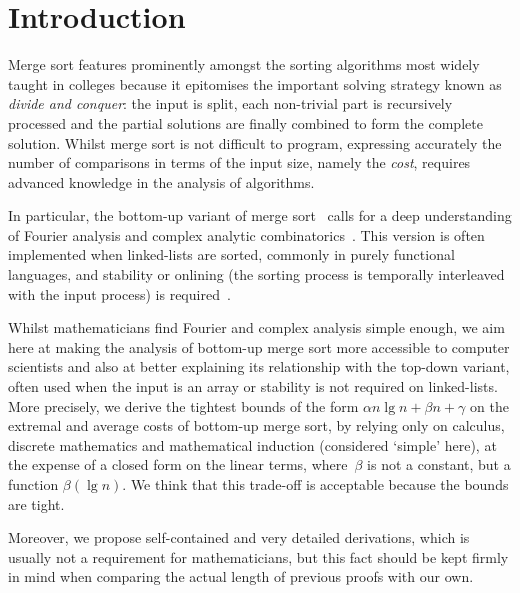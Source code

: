 \section{Introduction}

Merge sort features prominently amongst the sorting algorithms most
widely taught in colleges because it epitomises the important solving
strategy known as \emph{divide and conquer}: the input is split, each
non-trivial part is recursively processed and the partial
solutions are finally combined to form the complete solution. Whilst
merge sort is not difficult to program, expressing accurately the
number of comparisons in terms of the input size, namely the
\emph{cost}, requires advanced knowledge in the analysis of
algorithms.

In particular, the bottom-up variant of merge
sort~\cite{PannyProdinger:1995,Knuth:1998} calls for a deep
understanding of Fourier analysis and complex analytic
combinatorics~\cite{Delange:1975, FlajoletGolin:1994, Hwang:1998,
  ChenHwangChen:1999, FlajoletSedgewick:2009}. This version is often
implemented when linked-lists are sorted, commonly in purely
functional languages, and stability or onlining (the sorting process
is temporally interleaved with the input process) is
required~\cite{Okasaki:1998}.

Whilst mathematicians find Fourier and complex analysis simple enough,
we aim here at making the analysis of bottom-up merge sort more
accessible to computer scientists and also at better explaining its
relationship with the top-down variant, often used when the input is
an array or stability is not required on linked-lists. More precisely,
we derive the tightest bounds of the form \(\alpha n\lg n + \beta n +
\gamma\) on the extremal and average costs of bottom-up merge sort, by
relying only on calculus, discrete mathematics and mathematical
induction (considered `simple' here), at the expense of a closed form
on the linear terms, where~\(\beta\) is not a constant, but a function
\(\beta(\lg n)\). We think that this trade-off is acceptable because
the bounds are tight.

Moreover, we propose self-contained and very detailed derivations,
which is usually not a requirement for mathematicians, but this fact
should be kept firmly in mind when comparing the actual length of
previous proofs with our own.
